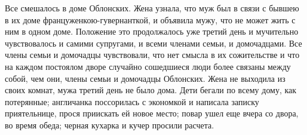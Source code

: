 \documentclass[14pt, a4paper]{article}
\begin{document}
Все смешалось в доме Облонских. Жена узнала, что муж был в связи с бывшею в их доме француженкою-гувернанткой, и объявила мужу, что не может жить с ним в одном доме. Положение это продолжалось уже третий день и мучительно чувствовалось и самими супругами, и всеми членами семьи, и домочадцами. Все члены семьи и домочадцы чувствовали, что нет смысла в их сожительстве и что на каждом постоялом дворе случайно сошедшиеся люди более связаны между собой, чем они, члены семьи и домочадцы Облонских. Жена не выходила из своих комнат, мужа третий день не было дома. Дети бегали по всему дому, как потерянные; англичанка поссорилась с экономкой и написала записку приятельнице, прося приискать ей новое место; повар ушел еще вчера со двора, во время обеда; черная кухарка и кучер просили расчета.
\end{document}

